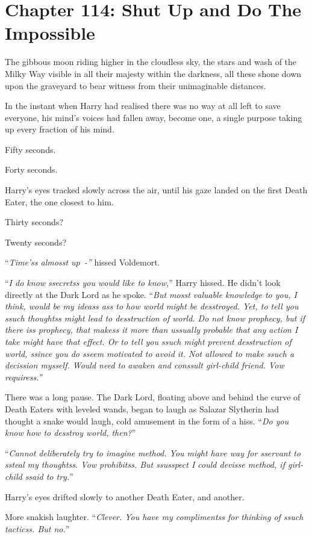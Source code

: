\chapter{Chapter 114: Shut Up and Do The Impossible}
The gibbous moon riding higher in the cloudless sky, the stars and wash of the Milky Way visible in all their majesty within the darkness, all these shone down upon the graveyard to bear witness from their unimaginable distances.

In the instant when Harry had realised there was no way at all left to save everyone, his mind's voices had fallen away, become one, a single purpose taking up every fraction of his mind.

Fifty seconds.

Forty seconds.

Harry's eyes tracked slowly across the air, until his gaze landed on the first Death Eater, the one closest to him.

Thirty seconds?

Twenty seconds?

``\emph{Time'ss almosst up~-''} hissed Voldemort.

``\emph{I do know ssecretss you would like to know,}'' Harry hissed. He didn't look directly at the Dark Lord as he spoke. ``\emph{But mosst valuable knowledge to you, I think, would be my ideass ass to how world might be desstroyed. Yet, to tell you ssuch thoughtss might lead to desstruction of world. Do not know prophecy, but if there iss prophecy, that makess it more than ussually probable that any action I take might have that effect. Or to tell you ssuch might prevent desstruction of world, ssince you do sseem motivated to avoid it. Not allowed to make ssuch a decission mysself. Would need to awaken and conssult girl-child friend. Vow requiress.''}

There was a long pause. The Dark Lord, floating above and behind the curve of Death Eaters with leveled wands, began to laugh as Salazar Slytherin had thought a snake would laugh, cold amusement in the form of a hiss. ``\emph{Do you know how to desstroy world, then?}''

``\emph{Cannot deliberately try to imagine method. You might have way for sservant to ssteal my thoughtss. Vow prohibitss. But ssusspect I could devisse method, if girl-child ssaid to try.}''

Harry's eyes drifted slowly to another Death Eater, and another.

More snakish laughter. ``\emph{Clever. You have my complimentss for thinking of ssuch tacticss. But no.}''

